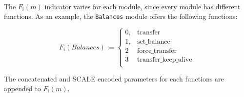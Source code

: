 \begin{definition}
    \label{defn-function-indicator}
    The $F_i(m)$ indicator varies for each module, since every module has
    different functions. As an example, the \verb|Balances| module offers the
    following functions:

    \[
    F_i(Balances) :=
    \begin{cases}
    0, & \text{transfer} \\
    1, & \text{set\_balance} \\
    2 & \text{force\_transfer} \\
    3 & \text{transfer\_keep\_alive} \\
    \end{cases}
    \]

    The concatenated and SCALE encoded parameters for each functions are
    appended to $F_i(m)$.
\end{definition}

